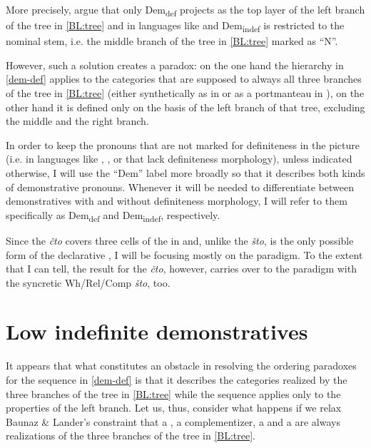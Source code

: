 More precisely, \cite{BaunazLander2018} argue that only Dem\textsubscript{def} projects as the top layer of the left branch of the tree in \ref{BL:tree} and in languages like  and  Dem\textsubscript{indef} is restricted to the nominal stem, i.e. the middle branch of the tree in \ref{BL:tree} marked as ``N''. 
\par
However, such a solution creates a paradox: on the one hand the hierarchy in \ref{dem-def} 
applies to the categories that are supposed to always  all three branches of the tree in \ref{BL:tree} (either synthetically as in  or as a portmanteau in ), on the other hand it is defined only on the basis of the left branch of that tree, excluding the middle and the right branch.
\par
 In order to keep the  pronouns that are not marked for definiteness in the picture (i.e. in  languages like , , or  that lack definiteness morphology), unless indicated otherwise, I will use the ``Dem'' label more broadly so that it describes both kinds of demonstrative pronouns. Whenever it will be needed to differentiate between demonstratives with and without definiteness morphology, I will refer to them specifically as Dem\textsubscript{def} and Dem\textsubscript{indef}, respectively.
 \par
Since the  \textit{\v{c}to} covers three cells of the  in   and, unlike the  \textit{\v{s}to}, is the only possible form of the declarative , I will be focusing mostly on the  paradigm. To the extent that I can tell, the result for the  \textit{\v{c}to}, however, carries over to the  paradigm with the syncretic Wh/Rel/Comp \textit{\v{s}to}, too.

\section{Low indefinite demonstratives}\largerpage

\noindent It appears that what constitutes an obstacle in resolving the ordering paradoxes for the sequence in \ref{dem-def} is that it describes the categories realized by the three branches of the tree in \ref{BL:tree} while the sequence applies only to the properties of the left branch. Let us, thus, consider what happens if we relax Baunaz \& Lander's constraint that a , a complementizer, a  and a  are always realizations of the three branches of the tree in \ref{BL:tree}.

